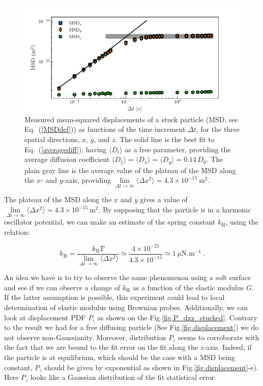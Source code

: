 \begin{figure}[H]
	\centering
	\includegraphics{02_body/chapter4/images/stucked_particle/MSD_stucked.pdf}
	\caption{Measured mean-squared displacements of a stuck particle (MSD, see Eq.~(\ref{MSDdef})) as functions of the time increment $\Delta t$, for the three spatial directions, $x$, $y$, and $z$. The solid line is the best fit to Eq.~(\ref{averagediff}), having $\langle D_i \rangle$ as a free parameter,
		providing the average diffusion coefficient $\langle{D_\parallel}\rangle= \langle D_x\rangle=\langle D_y \rangle =0.14\,D_0$. The plain gray line is the average value of the plateau of the MSD along the $x$- and $y$-axis, providing $ \lim\limits_{\Delta t \rightarrow \infty }\langle \Delta x ^2 \rangle = 4.3 \times 10 ^{-15} ~ \mathrm{m^2}$.}
	\label{fig.MSD_stucked}
\end{figure}

The plateau of the MSD along the $x$ and $y$ gives a value of  $ \lim\limits_{\Delta t \rightarrow \infty }\langle \Delta x ^2 \rangle = 4.3 \times 10 ^{-15} ~ \mathrm{m^2}$. By supposing that the particle is in a harmonic oscillator potential, we can make an estimate of the spring constant $k_\mathrm{H}$, using the relation:

\begin{equation}
	k_\mathrm{H} = \frac{k_\mathrm{B} T}{ \lim\limits_{\Delta t \rightarrow \infty }\langle \Delta x ^2 \rangle}  \simeq \frac{4 \times 10^{-21}}{4.3 \times 10 ^{-15}} \simeq 1 ~ \mathrm{\mu N . m^{-1}}~.
\end{equation}

An idea we have is to try to observe the same phenomenon using a soft surface and see if we can observe a change of $k_\mathrm{H}$ as a function of the elastic modulus $G$. If the latter assumption is possible, this experiment could lead to local determination of elastic modulus using Brownian probes. Additionally, we can look at displacement \gls{PDF} $P_i$ as shown on the Fig.\ref{fig.P_dxz_stucked}. Contrary to the result we had for a free diffusing particle (See Fig.\ref{fig.displacement}) we do not observe non-Gaussianity. Moreover, distribution $P_z$ seems to corroborate with the fact that we are bound to the fit error on the fit along the $z$-axis. Indeed, if the particle is at equilibrium, which should be the case with a MSD being constant, $P_z$ should be given by exponential as shown in Fig.\ref{fig.displacement}-e). Here $P_z$ looks like a Gaussian distribution of the fit statistical error.


